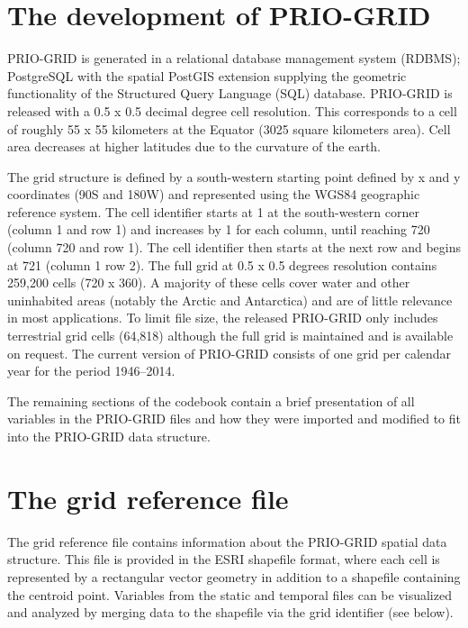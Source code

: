 \documentclass[]{book}
\begin{document}
\section{The development of
PRIO-GRID}\label{the-development-of-prio-grid}

PRIO-GRID is generated in a relational database management system
(RDBMS); PostgreSQL with the spatial PostGIS extension supplying the
geometric functionality of the Structured Query Language (SQL) database.
PRIO-GRID is released with a 0.5 x 0.5 decimal degree cell resolution.
This corresponds to a cell of roughly 55 x 55 kilometers at the Equator
(3025 square kilometers area). Cell area decreases at higher latitudes
due to the curvature of the earth.

The grid structure is defined by a south-western starting point defined
by x and y coordinates (90S and 180W) and represented using the WGS84
geographic reference system. The cell identifier starts at 1 at the
south-western corner (column 1 and row 1) and increases by 1 for each
column, until reaching 720 (column 720 and row 1). The cell identifier
then starts at the next row and begins at 721 (column 1 row 2). The full
grid at 0.5 x 0.5 degrees resolution contains 259,200 cells (720 x 360).
A majority of these cells cover water and other uninhabited areas
(notably the Arctic and Antarctica) and are of little relevance in most
applications. To limit file size, the released PRIO-GRID only includes
terrestrial grid cells (64,818) although the full grid is maintained and
is available on request. The current version of PRIO-GRID consists of
one grid per calendar year for the period 1946--2014.

The remaining sections of the codebook contain a brief presentation of
all variables in the PRIO-GRID files and how they were imported and
modified to fit into the PRIO-GRID data structure.

\section{The grid reference file}\label{the-grid-reference-file}

The grid reference file contains information about the PRIO-GRID spatial
data structure. This file is provided in the ESRI shapefile format,
where each cell is represented by a rectangular vector geometry in
addition to a shapefile containing the centroid point. Variables from
the static and temporal files can be visualized and analyzed by merging
data to the shapefile via the grid identifier (see below).
\end{document}
